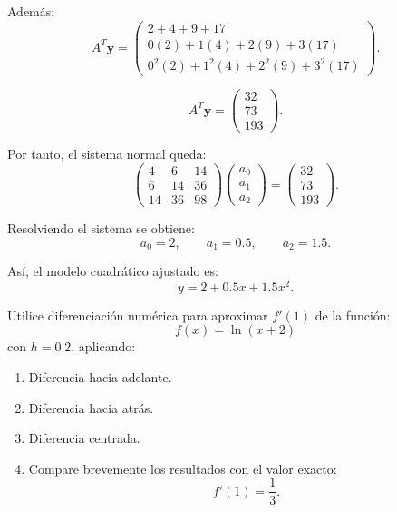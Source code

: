 \documentclass[11pt,respuestas,a4]{aleph-examen}
\begin{document}
\begin{preguntas}
\begin{respuesta}
Además:
\[
A^T\mathbf{y}=
\begin{pmatrix}
2+4+9+17\\
0(2)+1(4)+2(9)+3(17)\\
0^2(2)+1^2(4)+2^2(9)+3^2(17)
\end{pmatrix}.
\]

\[
A^T\mathbf{y}=
\begin{pmatrix}
32\\
73\\
193
\end{pmatrix}.
\]

Por tanto, el sistema normal queda:
\[
\begin{pmatrix}
4 & 6 & 14 \\
6 & 14 & 36 \\
14 & 36 & 98
\end{pmatrix}
\begin{pmatrix}
a_0\\
a_1\\
a_2
\end{pmatrix}
=
\begin{pmatrix}
32\\
73\\
193
\end{pmatrix}.
\]

Resolviendo el sistema se obtiene:
\[
a_0=2,
\qquad
a_1=0.5,
\qquad
a_2=1.5.
\]

Así, el modelo cuadrático ajustado es:
\[
\boxed{y=2+0.5x+1.5x^2}.
\]
\end{respuesta}


\item
Utilice diferenciación numérica para aproximar $f'(1)$ de la función: 
\[
f(x)=\ln(x+2)
\]
con $h=0.2$, aplicando:

\begin{enumerate}[label=\alph*)]
    \item Diferencia hacia adelante.
    \item Diferencia hacia atrás.
    \item Diferencia centrada.
    \item Compare brevemente los resultados con el valor exacto:
    \[
    f'(1)=\frac{1}{3}.
    \]
\end{enumerate}


\end{preguntas}
\end{document}

